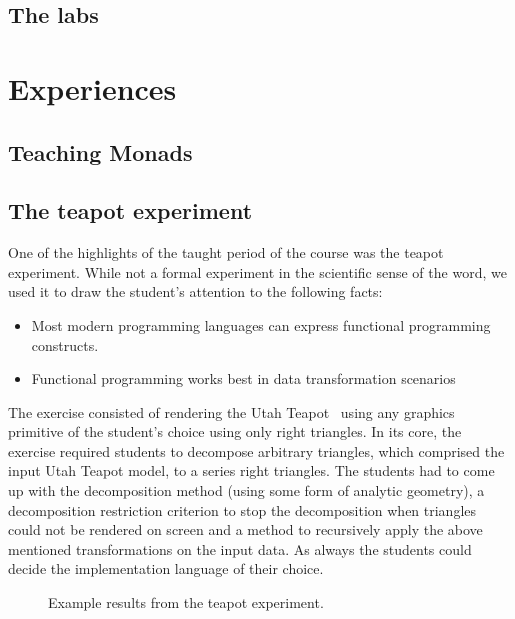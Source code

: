 \documentclass[conference]{IEEEtran}
\begin{document}
\subsection{The labs}



\section{Experiences}

\subsection{Teaching Monads}

\subsection{The teapot experiment}

One of the highlights of the taught period of the course was the teapot
experiment. While not a formal experiment in the scientific sense of the word,
we used it to draw the student's attention to the following facts:

\begin{itemize}

  \item Most modern programming languages can express functional programming
    constructs.

  \item Functional programming works best in data transformation scenarios

\end{itemize}

The exercise consisted of rendering the Utah Teapot~\cite{Torre06} using any
graphics primitive of the student's choice using only right triangles.  In its
core, the exercise required students to decompose arbitrary triangles, which
comprised the input Utah Teapot model, to a series right triangles. The
students had to come up with the decomposition method (using some form of
analytic geometry), a decomposition restriction criterion to stop the
decomposition when triangles could not be rendered on screen and a method to
recursively apply the above mentioned transformations on the input data. As
always the students could decide the implementation language of their choice.

\begin{figure*}
\centering
{}
\label{fig:proj}
\caption[]{Example results from the teapot experiment.}
\end{figure*}
\end{document}
